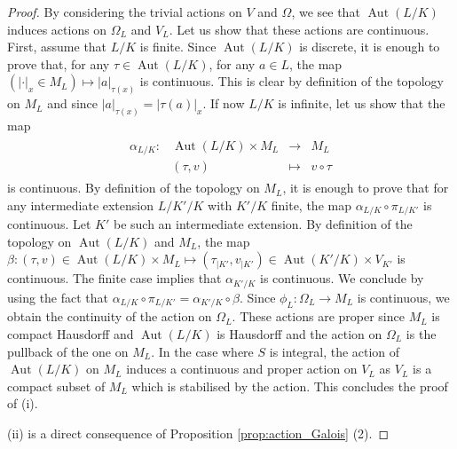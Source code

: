 \documentclass [11pt,reqno]{amsart}
\newcommand{\1}{\mathmybb{1}}
\def\Aut{\operatorname{Aut}}
\newcommand{\va}{|\cdot|}
\newcommand{\fonction}[5]{\begin{array}{l|rcl}
#1: & #2 & \longrightarrow & #3 \\
    & #4 & \longmapsto & #5 \end{array}}
\begin{document}
\begin{proof}
By considering the trivial actions on $V$ and $\Omega$, we see that $\Aut(L/K)$ induces actions on $\Omega_L$ and $V_L$. Let us show that these actions are continuous. First, assume that $L/K$ is finite. Since $\Aut(L/K)$ is discrete, it is enough to prove that, for any $\tau\in \Aut(L/K)$, for any $a\in L$, the map $(\va_x\in M_L) \mapsto |a|_{\tau(x)}$ is continuous. This is clear by definition of the topology on $M_{L}$ and since $|a|_{\tau(x)} = |\tau(a)|_x$. If now $L/K$ is infinite, let us show that the map 
\begin{align*}
\fonction{\alpha_{L/K}}{\Aut(L/K)\times M_L}{M_L}{(\tau,v)}{v\circ\tau}
\end{align*}
is continuous. By definition of the topology on $M_L$, it is enough to prove that for any intermediate extension $L/K'/K$ with $K'/K$ finite, the map $\alpha_{L/K} \circ \pi_{L/K'}$ is continuous. Let $K'$ be such an intermediate extension. By definition of the topology on $\Aut(L/K)$ and $M_L$, the map $\beta : (\tau,v)\in \Aut(L/K)\times M_L \mapsto (\tau_{|K'},v_{|K'}) \in \Aut(K'/K)\times V_{K'}$ is continuous. The finite case implies that $\alpha_{K'/K}$ is continuous. We conclude by using the fact that $\alpha_{L/K} \circ \pi_{L/K'} = \alpha_{K'/K} \circ\beta$. Since $\phi_{L} :\Omega_L \to M_L$ is continuous, we obtain the continuity of the action on $\Omega_L$. These actions are proper since $M_L$ is compact Hausdorff and $\Aut(L/K)$ is Hausdorff and the action on $\Omega_{L}$ is the pullback of the one on $M_{L}$. In the case where $S$ is integral, the action of $\Aut(L/K)$ on $M_L$ induces a continuous and proper action on $V_L$ as $V_L$ is a compact subset of $M_L$ which is stabilised by the action. This concludes the proof of (i).

(ii) is a direct consequence of Proposition \ref{prop:action_Galois} (2).


\end{proof}
\end{document}
